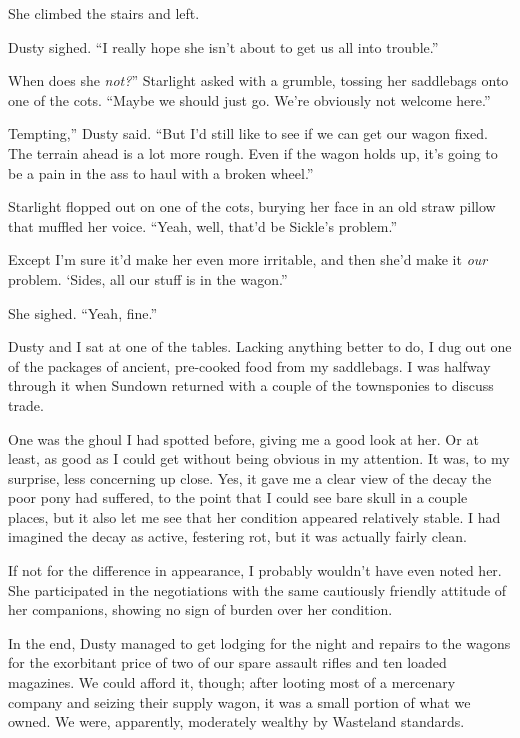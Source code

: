 She climbed the stairs and left.

Dusty sighed. “I really hope she isn’t about to get us all into trouble.”

\leavevmode{}When does she \textit{not?}” Starlight asked with a grumble, tossing her saddlebags onto one of the cots. “Maybe we should just go. We’re obviously not welcome here.”

\leavevmode{}Tempting,” Dusty said. “But I’d still like to see if we can get our wagon fixed. The terrain ahead is a lot more rough. Even if the wagon holds up, it’s going to be a pain in the ass to haul with a broken wheel.”

Starlight flopped out on one of the cots, burying her face in an old straw pillow that muffled her voice. “Yeah, well, that’d be Sickle’s problem.”

\leavevmode{}Except I’m sure it’d make her even more irritable, and then she’d make it \textit{our} problem. ‘Sides, all our stuff is in the wagon.”

She sighed. “Yeah, fine.”

Dusty and I sat at one of the tables. Lacking anything better to do, I dug out one of the packages of ancient, pre-cooked food from my saddlebags. I was halfway through it when Sundown returned with a couple of the townsponies to discuss trade.

One was the ghoul I had spotted before, giving me a good look at her. Or at least, as good as I could get without being obvious in my attention. It was, to my surprise, less concerning up close. Yes, it gave me a clear view of the decay the poor pony had suffered, to the point that I could see bare skull in a couple places, but it also let me see that her condition appeared relatively stable. I had imagined the decay as active, festering rot, but it was actually fairly clean.

If not for the difference in appearance, I probably wouldn’t have even noted her. She participated in the negotiations with the same cautiously friendly attitude of her companions, showing no sign of burden over her condition.

In the end, Dusty managed to get lodging for the night and repairs to the wagons for the exorbitant price of two of our spare assault rifles and ten loaded magazines. We could afford it, though; after looting most of a mercenary company and seizing their supply wagon, it was a small portion of what we owned. We were, apparently, moderately wealthy by Wasteland standards.

